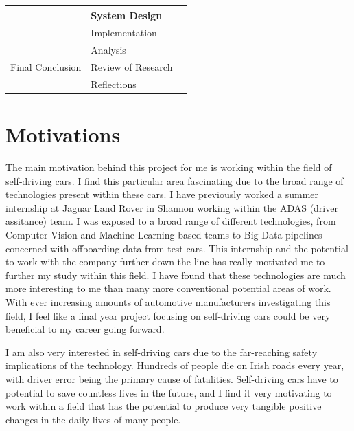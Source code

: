 \documentclass[12pt]{report}
\begin{document}
\begin{table}[]
\begin{tabular}{|l|l|l|}
                          & System Design            &                      \\ \hline  
                          & Implementation           &                      \\ \hline
                          & Analysis                 &                      \\ \hline           
Final Conclusion          & Review of Research       &                      \\ \hline
                          & Reflections              &                      \\ \hline                          
\end{tabular}
\end{table}

\newpage
\section{Motivations}
\begin{flushleft}
The main motivation behind this project for me is working within the field of self-driving cars. I find this particular area fascinating due to the broad range of technologies present within these cars. I have previously worked a summer internship at Jaguar Land Rover in Shannon working within the ADAS (driver assitance) team. I was exposed to a broad range of different technologies, from Computer Vision and Machine Learning based teams to Big Data pipelines concerned with offboarding data from test cars. This internship and the potential to work with the company further down the line has really motivated me to further my study within this field. I have found that these technologies are much more interesting to me than many more conventional potential areas of work. With ever increasing amounts of automotive manufacturers investigating this field, I feel like a final year project focusing on self-driving cars could be very beneficial to my career going forward.

I am also very interested in self-driving cars due to the far-reaching safety implications of the technology. Hundreds of people die on Irish roads every year, with driver error being the primary cause of fatalities. Self-driving cars have to potential to save countless lives in the future, and I find it very motivating to work within a field that has the potential to produce very tangible positive changes in the daily lives of many people.
\end{flushleft}
\end{document}
